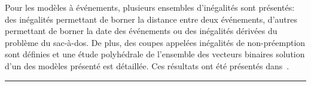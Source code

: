 \begin{center}
\begin{minipage}{\textwidth}
{      Pour les modèles à événements, plusieurs ensembles d'inégalités
      sont présentés: des inégalités permettant de borner la distance
      entre deux événements, d'autres permettant de borner la date des
      événements ou des inégalités dérivées du problème du
      sac-à-dos. De plus, des coupes appelées inégalités de
      non-préemption sont définies et une étude polyhédrale de
      l'ensemble des vecteurs binaires solution d'un des modèles
      présenté est détaillée. Ces résultats ont été présentés 
      dans~\cite{Nattaf_ROADEF16,Nattaf_ECCO16}. }
    \vspace{0.5cm}
    \hrule
  \end{minipage}
\end{center}

 


